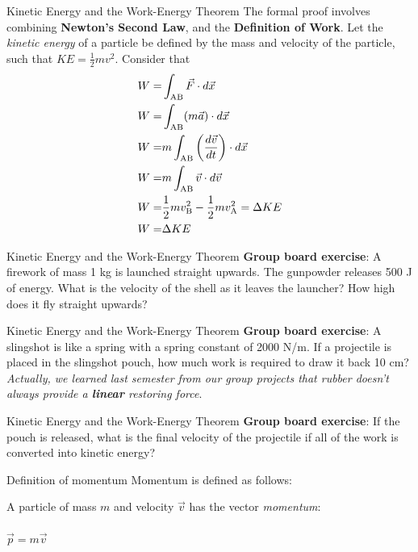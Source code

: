 \documentclass{beamer}
\begin{document}
\begin{frame}{Kinetic Energy and the Work-Energy Theorem}
\small
The formal proof involves combining \textbf{Newton's Second Law}, and the \textbf{Definition of Work}.  Let the \textit{kinetic energy} of a particle be defined by the mass and velocity of the particle, such that $KE = \frac{1}{2}mv^2$.  Consider that
\begin{align}
W =& \int_{\rm AB} \vec{F} \cdot d\vec{x} \\
W =& \int_{\rm AB} (m\vec{a}) \cdot d\vec{x} \\
W =& m\int_{\rm AB} \left( \frac{d\vec{v}}{dt} \right) \cdot d\vec{x} \\
W =& m\int_{\rm AB} \vec{v} \cdot d\vec{v} \\
W =& \frac{1}{2}m v_{\rm B}^2 - \frac{1}{2}m v_{\rm A}^2 = \Delta KE \\
W =& \Delta KE
\end{align}
\end{frame}

\begin{frame}{Kinetic Energy and the Work-Energy Theorem}
\textbf{Group board exercise}: A firework of mass 1 kg is launched straight upwards.  The gunpowder releases 500 J of energy.  What is the velocity of the shell as it leaves the launcher?  How high does it fly straight upwards?
\end{frame}

\begin{frame}{Kinetic Energy and the Work-Energy Theorem}
\textbf{Group board exercise}: A slingshot is like a spring with a spring constant of 2000 N/m.  If a projectile is placed in the slingshot pouch, how much work is required to draw it back 10 cm? \\ \vspace{0.5cm}
\small
\textit{Actually, we learned last semester from our group projects that rubber doesn't always provide a \textbf{linear} restoring force}.
\end{frame}

\begin{frame}{Kinetic Energy and the Work-Energy Theorem}
\textbf{Group board exercise}: If the pouch is released, what is the final velocity of the projectile if all of the work is converted into kinetic energy?
\end{frame}

\begin{frame}{Definition of momentum}
Momentum is defined as follows: \\ \vspace{1cm}
\begin{tcolorbox}[colback=white,colframe=red!40!blue,title=Definition of Momentum]
\alert{A particle of mass $m$ and velocity $\vec{v}$ has the vector \textit{momentum}:} \\ \\
\alert{$\vec{p} = m\vec{v}$}
\end{tcolorbox}
\end{frame}
\end{document}
